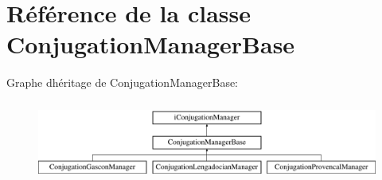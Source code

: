 \hypertarget{classConjugationManagerBase}{}\section{Référence de la classe Conjugation\+Manager\+Base}
\label{classConjugationManagerBase}
Graphe d\textquotesingle{}héritage de Conjugation\+Manager\+Base\+:\begin{figure}[H]
\begin{center}
\leavevmode
\includegraphics[height=2.654028cm]{classConjugationManagerBase}
\end{center}
\end{figure}
